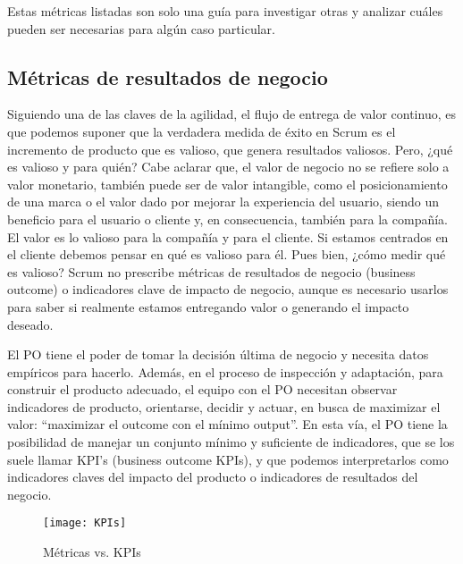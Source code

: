 Estas métricas listadas son solo una guía para investigar otras y analizar cuáles pueden ser necesarias para algún caso particular.

\subsection{Métricas de resultados de negocio}

Siguiendo una de las claves de la agilidad, el flujo de entrega de valor continuo, es que podemos suponer que la verdadera medida de éxito en Scrum es el incremento de producto que es valioso, que genera resultados valiosos. Pero, ¿qué es valioso y para quién? Cabe aclarar que, el valor de negocio no se refiere solo a valor monetario, también puede ser de valor intangible, como el posicionamiento de una marca o el valor dado por mejorar la experiencia del usuario, siendo un beneficio para el usuario o cliente y, en consecuencia, también para la compañía. El valor es lo valioso para la compañía y para el cliente. Si estamos centrados en el cliente debemos pensar en qué es valioso para él. Pues bien, ¿cómo medir qué es valioso?
Scrum no prescribe métricas de resultados de negocio (business outcome) o indicadores clave de impacto de negocio, aunque es necesario usarlos para saber si realmente estamos entregando valor o generando el impacto deseado. 

El PO tiene el poder de tomar la decisión última de negocio y necesita datos empíricos para hacerlo. Además, en el proceso de inspección y adaptación, para construir el producto adecuado, el equipo con el PO necesitan observar indicadores de producto, orientarse, decidir y actuar, en busca de maximizar el valor: “maximizar el outcome con el mínimo output”. En esta vía, el PO tiene la posibilidad de manejar un conjunto mínimo y suficiente de indicadores, que se los suele llamar KPI's (business outcome KPIs), y que podemos interpretarlos como indicadores claves del impacto del producto o indicadores de resultados del negocio.

\begin{figure}[h]
  \centering
  \texttt{[image: KPIs]}
  \caption{Métricas vs. KPIs}
  \centering
  \label{fig:KPIs} %
\end{figure}
\FloatBarrier %

